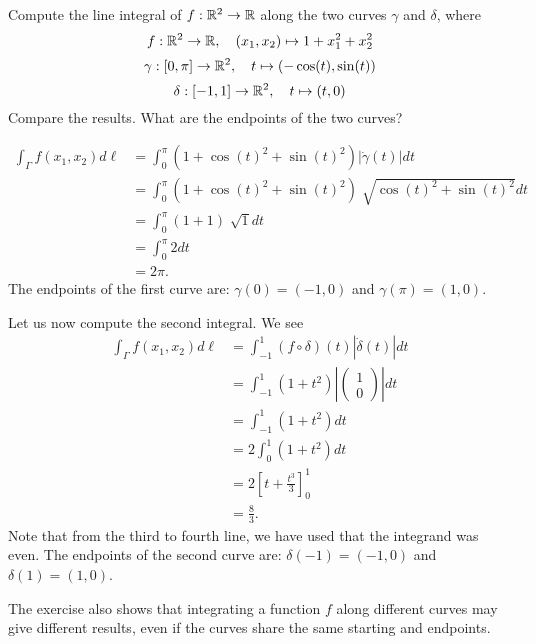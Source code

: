\documentclass[11pt]{article}
\begin{document}
\begin{exercise}
    Compute the line integral of $f : \mathbb{R}^2 \rightarrow \mathbb{R}$ along the two curves $\gamma$ and $\delta$, 
    where 
    \[
        f : \mathbb{R}^2 \to \mathbb{R}, \quad (x_1,x_2) \mapsto 1 + x_1^2 + x_2^2
    \]
    \[
        \gamma : [0,\pi] \rightarrow \mathbb{R}^2, \quad t \mapsto ( -\cos(t), \sin(t) )
    \]
    \[
        \delta : [-1,1] \rightarrow \mathbb{R}^2, \quad t \mapsto (t,0)
    \]
    Compare the results. What are the endpoints of the two curves? 
\end{exercise}
\begin{solution}     
    \begin{align*}
        \int_{\Gamma} f(x_1,x_2) d\ell 
        &= \int_{0}^{\pi} ( 1 + \cos(t)^2 + \sin(t)^2 ) |\dot{\gamma}(t)|dt
        \\&= \int_{0}^{\pi} ( 1 + \cos(t)^2 + \sin(t)^2 ) \sqrt[]{\cos(t)^2 + \sin(t)^2} dt
        \\&= \int_{0}^{\pi} ( 1 + 1 ) \sqrt[]{1} dt
        \\&= \int_{0}^{\pi} 2 dt
        \\&= 2\pi.
    \end{align*}
    The endpoints of the first curve are: $\gamma(0) = (-1,0)$ and $\gamma(\pi) = (1,0)$.

    Let us now compute the second integral. We see 
    \begin{align*}
        \int_{\Gamma} f(x_1,x_2) d\ell 
        &= \int_{-1}^{1} (f\circ \delta)(t)|\dot{\delta}(t)|dt
        \\&= \int_{-1}^1 (1+t^2)\left|\begin{pmatrix} 1\\0 \end{pmatrix}\right| dt
        \\&= \int_{-1}^1 (1+t^2) dt
        \\&= 2 \int_{0}^1 (1+t^2) dt
        \\&= 2\left[t+\frac{t^3}{3} \right]_{0}^{1}
        \\&= \frac 8 3.
    \end{align*}
    Note that from the third to fourth line, we have used that the integrand was even. 
    The endpoints of the second curve are: $\delta(-1) = (-1,0)$ and $\delta(1) = (1,0)$.

    The exercise also shows that integrating a function $f$ along different curves may give different results, 
    even if the curves share the same starting and endpoints. 
\end{solution}
\end{document}
